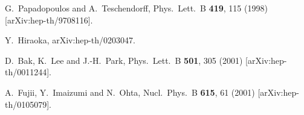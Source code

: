 \documentclass[a4paper,11pt]{article}
\begin{document}
\begin{thebibliography}{99}
G.~Papadopoulos and A.~Teschendorff,
Phys.\ Lett.\ B {\bf 419}, 115 (1998) [arXiv:hep-th/9708116].

Y.~Hiraoka,
arXiv:hep-th/0203047.




D.~Bak, K.~Lee and J.-H.~Park,
Phys.\ Lett.\ B {\bf 501}, 305 (2001) [arXiv:hep-th/0011244].



A.~Fujii, Y.~Imaizumi and N.~Ohta,
Nucl.\ Phys.\ B {\bf 615}, 61 (2001) [arXiv:hep-th/0105079].








\end{thebibliography}
\end{document}
